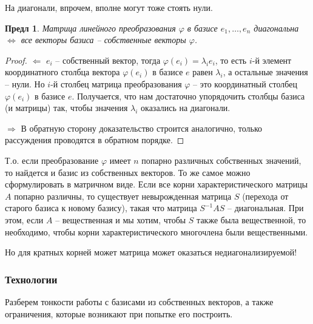 \documentclass[a4paper,12pt]{article}
\newtheorem{propos}{Предл}[section]
\begin{document}
На диагонали, впрочем, вполне могут тоже стоять нули.

\begin{propos}
	Матрица линейного преобразования $\varphi$ в базисе $e_1, \ldots, e_n$ диагональна $\Leftrightarrow$ все векторы базиса -- собственные векторы $\varphi$.
\end{propos}
\begin{proof}
	$\Leftarrow$ $e_i$ -- собственный вектор, тогда $\varphi(e_i) = \lambda_i e_i$, то есть $i$-й элемент координатного столбца вектора $\varphi(e_i)$ в базисе $e$ равен $\lambda_i$, а остальные значения -- нули. Но $i$-й столбец матрица преобразования $\varphi$ -- это координатный столбец $\varphi(e_i)$ в базисе $e$. Получается, что нам достаточно упорядочить столбцы базиса (и матрицы) так, чтобы значения $\lambda_i$ оказались на диагонали.
	
	$\Rightarrow$ В обратную сторону доказательство строится аналогично, только рассуждения проводятся в обратном порядке.
\end{proof}

Т.о. если преобразование $\varphi$ имеет $n$ попарно различных собственных значений, то найдется и базис из собственных векторов. То же самое можно сформулировать в матричном виде. Если все корни характеристического матрицы $A$ попарно различны, то существует невырожденная матрица $S$ (перехода от старого базиса к новому базису), такая что матрица $S^{-1} A S$ -- диагональная. При этом, если $A$ -- вещественная и мы хотим, чтобы $S$ также была вещественной, то необходимо, чтобы корни характеристического многочлена были вещественными.

Но для кратных корней может матрица может оказаться недиагонализируемой! 

\subsubsection{Технологии}

Разберем тонкости работы с базисами из собственных векторов, а также ограничения, которые возникают при попытке его построить.
\end{document}
